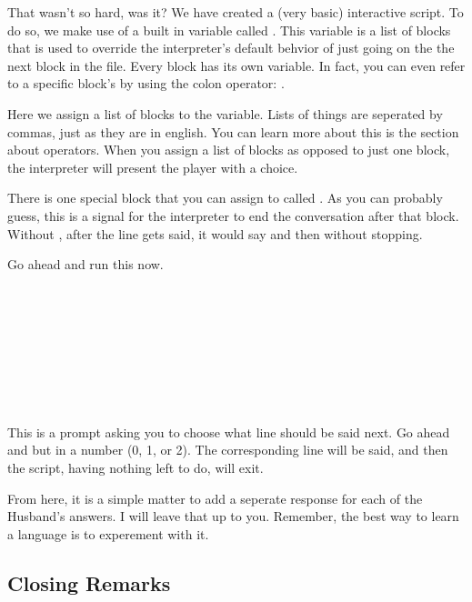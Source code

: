 \documentclass{book}
\begin{document}
That wasn't so hard, was it?  We have created a (very basic) interactive script.  To do so, we make use of a built in variable called .  This variable is a list of blocks that is used to override the interpreter's default behvior of just going on the the next block in the file.  Every block has its own  variable.   In fact, you can even refer to a specific block's  by using the colon operator:  .

 Here we assign a list of blocks to the  variable.  Lists of things are seperated by commas, just as they are in english.  You can learn more about this is the section about operators.  When you assign a list of blocks as opposed to just one block, the interpreter will present the player with a choice.  

 There is one special block that you can assign to called .  As you can probably guess, this is a signal for the interpreter to end the conversation after that block. Without , after the line  gets said, it would say  and then  without stopping.

Go ahead and run this now.

\begin{SSCodeBox}
 \\
 \\ \\
 \\
 \\
 \\ \\
\scited{>}
\end{SSCodeBox}

This is a prompt asking you to choose what line should be said next.  Go ahead and but in a number (0, 1, or 2).  The corresponding line will be said, and then the script, having nothing left to do, will exit.

From here, it is a simple matter to add a seperate response for each of the Husband's answers.  I will leave that up to you.  Remember, the best way to learn a language is to experement with it.

\subsection{Closing Remarks}
\end{document}
